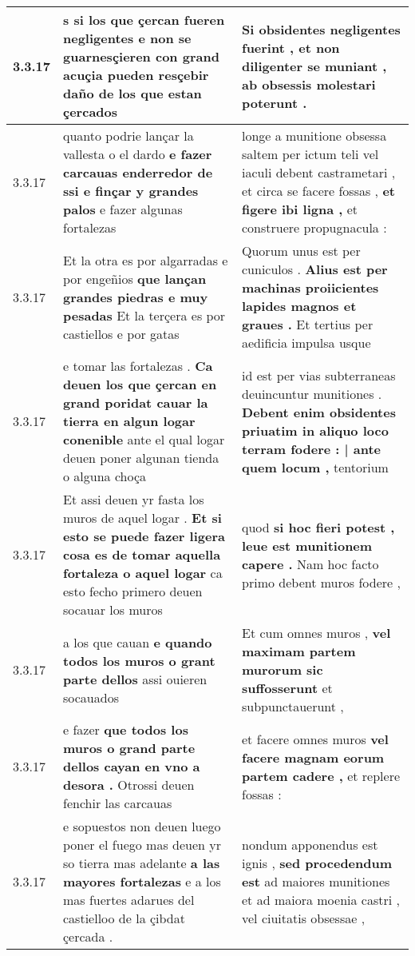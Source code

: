 \begin{tabular}{|p{1cm}|p{6.5cm}|p{6.5cm}|}
3.3.17 & s si los que çercan fueren negligentes \textbf{ e non se guarnesçieren con grand acuçia } pueden resçebir daño de los que estan çercados & Si obsidentes negligentes fuerint , \textbf{ et non diligenter se muniant , } ab obsessis molestari poterunt . \\\hline
3.3.17 & quanto podrie lançar la vallesta o el dardo \textbf{ e fazer carcauas enderredor de ssi e finçar y grandes palos } e fazer algunas fortalezas & longe a munitione obsessa saltem per ictum teli vel iaculi debent castrametari , et circa se facere fossas , \textbf{ et figere ibi ligna , } et construere propugnacula : \\\hline
3.3.17 & Et la otra es por algarradas e por engeñios \textbf{ que lançan grandes piedras e muy pesadas } Et la terçera es por castiellos e por gatas & Quorum unus est per cuniculos . \textbf{ Alius est per machinas proiicientes lapides magnos et graues . } Et tertius per aedificia impulsa usque \\\hline
3.3.17 & e tomar las fortalezas . \textbf{ Ca deuen los que çercan en grand poridat cauar la tierra en algun logar conenible } ante el qual logar deuen poner algunan tienda o alguna choça & id est per vias subterraneas deuincuntur munitiones . \textbf{ Debent enim obsidentes priuatim in aliquo loco terram fodere : | ante quem locum , } tentorium \\\hline
3.3.17 & Et assi deuen yr fasta los muros de aquel logar . \textbf{ Et si esto se puede fazer ligera cosa es de tomar aquella fortaleza o aquel logar } ca esto fecho primero deuen socauar los muros & quod \textbf{ si hoc fieri potest , leue est munitionem capere . } Nam hoc facto primo debent muros fodere , \\\hline
3.3.17 & a los que cauan \textbf{ e quando todos los muros o grant parte dellos } assi ouieren socauados & Et cum omnes muros , \textbf{ vel maximam partem murorum sic suffosserunt } et subpunctauerunt , \\\hline
3.3.17 & e fazer \textbf{ que todos los muros o grand parte dellos cayan en vno a desora . } Otrossi deuen fenchir las carcauas & et facere omnes muros \textbf{ vel facere magnam eorum partem cadere , } et replere fossas : \\\hline
3.3.17 & e sopuestos non deuen luego poner el fuego mas deuen yr so tierra mas adelante \textbf{ a las mayores fortalezas } e a los mas fuertes adarues del castielloo de la çibdat çercada . & nondum apponendus est ignis , \textbf{ sed procedendum est } ad maiores munitiones et ad maiora moenia castri , vel ciuitatis obsessae , \\\hline

\end{tabular}
